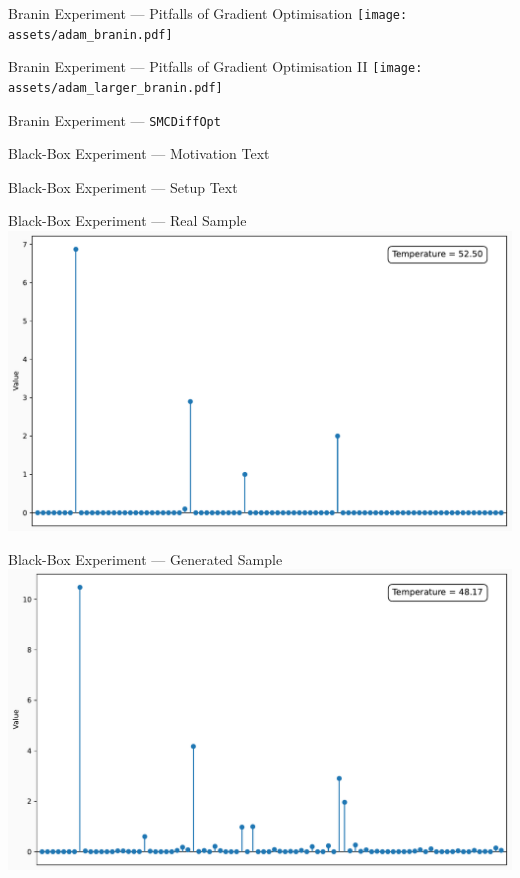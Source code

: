 \documentclass{beamer}
\begin{document}
    \begin{frame}{Branin Experiment --- Pitfalls of Gradient Optimisation}
        \centering
        \texttt{[image: assets/adam\_branin.pdf]}
    \end{frame}

    \begin{frame}{Branin Experiment --- Pitfalls of Gradient Optimisation II}
        \centering
        \texttt{[image: assets/adam\_larger\_branin.pdf]}
    \end{frame}

    \begin{frame}{Branin Experiment --- \texttt{SMCDiffOpt}}

    \end{frame}

    \begin{frame}{Black-Box Experiment --- Motivation}
        Text
    \end{frame}

    \begin{frame}{Black-Box Experiment --- Setup}
        Text
    \end{frame}

    \begin{frame}{Black-Box Experiment --- Real Sample}
        \centering
        \includegraphics[width=1\textwidth]{assets/bb-real-sample.pdf}
    \end{frame}

    \begin{frame}{Black-Box Experiment --- Generated Sample}
        \centering
        \includegraphics[width=1\textwidth]{assets/bb-unconditional-sample.pdf}
    \end{frame}
\end{document}
